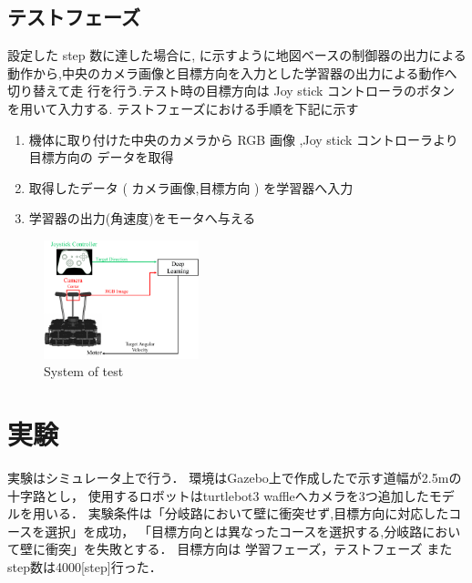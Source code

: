 \documentclass[10pt]{jarticle}
\begin{document}
    \subsection{テストフェーズ}
    設定した step 数に達した場合に, に示すように地図ベースの制御器の出力による
    動作から,中央のカメラ画像と目標方向を入力とした学習器の出力による動作へ切り替えて走
    行を行う.テスト時の目標方向は Joy stick コントローラのボタンを用いて入力する.
    テストフェーズにおける手順を下記に示す
    \begin{enumerate}
    \setlength{\parskip}{0cm} %
    \setlength{\itemsep}{0cm} %
    \item 機体に取り付けた中央のカメラから RGB 画像 ,Joy stick コントローラより目標方向の
    データを取得
    \item 取得したデータ ( カメラ画像,目標方向 ) を学習器へ入力
    \item 学習器の出力(角速度)をモータへ与える
    \end{enumerate}
    \begin{center}
        \begin{figure}[h]
            \centering
            \includegraphics[width=0.4\textwidth]{./fig/system_test.pdf}
            \caption{System of test}
            \label{fig:system_test}
        \end{figure}
    \end{center}
    
    \section{実\hspace{2zw}験}%
    実験はシミュレータ上で行う．
    環境はGazebo上で作成したで示す道幅が2.5mの十字路とし，
    使用するロボットはturtlebot3 waffleへカメラを3つ追加したモデルを用いる．
    実験条件は「分岐路において壁に衝突せず,目標方向に対応したコースを選択」を成功，
    「目標方向とは異なったコースを選択する,分岐路において壁に衝突」を失敗とする．
    目標方向は
    学習フェーズ，テストフェーズ
    またstep数は4000[step]行った．
       
\end{document}
